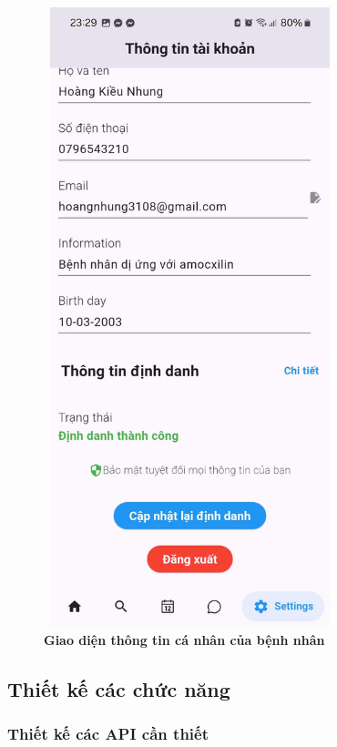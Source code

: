 \begin{figure}[H]
	\centering
	\includegraphics[width=8.5cm,height=18cm]{Images/AppUI/infoPatient.jpg}
	\caption[Giao diện thông tin cá nhân của bệnh nhân]{\bfseries \fontsize{12pt}{0pt}\selectfont Giao diện thông tin cá nhân của bệnh nhân}
	\label{TimePickWithDoctor}
\end{figure}
	\subsection{Thiết kế các chức năng}

\subsubsection{Thiết kế các API cần thiết}


